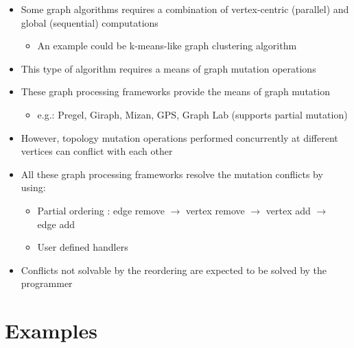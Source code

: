 \begin{frame}
\begin{itemize}
  \item Some graph algorithms requires a combination of vertex-centric (parallel) and global (sequential) computations
  	\begin{itemize}
	 \item An example could be k-means-like graph clustering algorithm
	 \end{itemize}
  \item This type of algorithm requires a means of graph mutation operations
   \item These graph processing frameworks provide the means of graph mutation
     	\begin{itemize}
		\item e.g.: Pregel, Giraph, Mizan, GPS, Graph Lab (supports partial mutation)
			 \end{itemize}
\end{itemize}	
\end{frame}


\begin{frame}
  	\begin{itemize}
		\item However, topology mutation operations performed concurrently at different vertices can conflict with each other
		 \item All these graph processing frameworks resolve the mutation conflicts by using:
  	  		\begin{itemize}
				\item Partial ordering : edge remove $\rightarrow$ vertex remove $\rightarrow$ vertex add $\rightarrow$ edge add
			\item User defined handlers
		\end{itemize}
		\item Conflicts not solvable by the reordering are expected to be solved by the programmer
	  \end{itemize}
\end{frame}

\section{Examples}
